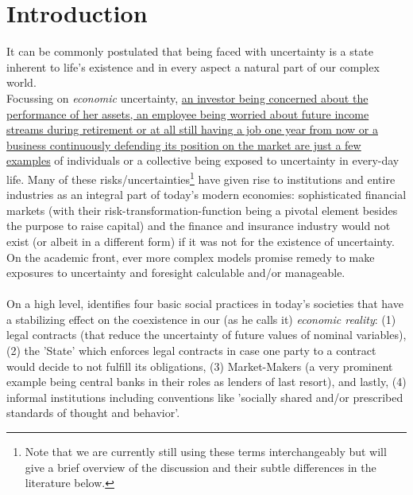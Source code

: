 \documentclass[a4paper,12pt,oneside,pointednumbers,bibtotoc,bigheadings,liststotoc]{scrbook}
\begin{document}
\chapter{Introduction}
It can be commonly postulated that being faced with uncertainty is a state inherent to life's existence and in every aspect a natural part of our complex world. \\
Focussing on \textit{economic} uncertainty, \href{http://citeseerx.ist.psu.edu/viewdoc/download?doi=10.1.1.334.4248&rep=rep1&type=pdf}{an investor being concerned about the performance of her assets, an employee being worried about future income streams during retirement or at all still having a job one year from now or a business continuously defending its position on the market are just a few examples} of individuals or a collective being exposed to uncertainty in every-day life. Many of these risks/uncertainties\footnote{Note that we are currently still using these terms interchangeably but will give a brief overview of the discussion and their subtle differences in the literature below.} have given rise to institutions and entire industries as an integral part of today's modern economies: sophisticated financial markets (with their risk-transformation-function being a pivotal element besides the purpose to raise capital) and the finance and insurance industry would not exist (or albeit in a different form) if it was not for the existence of uncertainty. On the academic front, ever more complex models promise remedy to make exposures to uncertainty and foresight calculable and/or manageable.\\
\\
On a high level, \citet{dequesh:00} identifies four basic social practices in today's societies that have a stabilizing effect on the coexistence in our (as  he calls it) \textit{economic reality}: (1) legal contracts (that reduce the uncertainty of future values of nominal variables), (2) the 'State' which enforces legal contracts in case one party to a contract would decide to not fulfill its obligations, (3) Market-Makers (a very prominent example being central banks in their roles as lenders of last resort), and lastly, (4) informal institutions including conventions like 'socially shared and/or prescribed standards of thought and behavior'. \\
\end{document}
